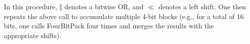 
\noindent In this procedure, \(\Vert\) denotes a bitwise OR, and \(\ll\) denotes a left shift. One then repeats the above call to accumulate multiple 4-bit blocks (e.g., for a total of 16 bits, one calls FourBitPack four times and merges the results with the appropriate shifts).